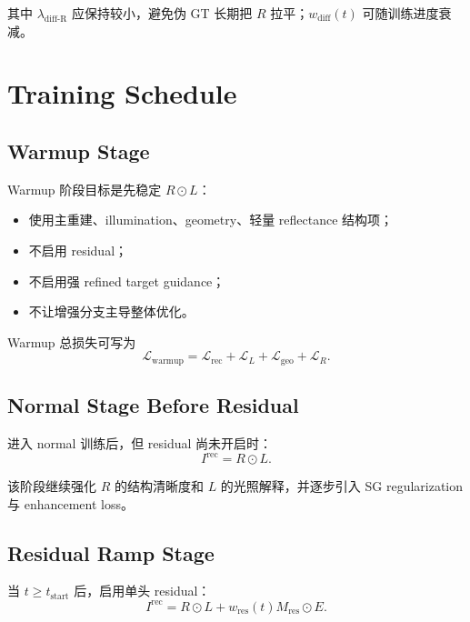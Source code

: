 \documentclass[11pt]{article}
\begin{document}
其中 $\lambda_{\text{diff-R}}$ 应保持较小，避免伪 GT 长期把 $R$ 拉平；$w_{\text{diff}}(t)$ 可随训练进度衰减。

\section{Training Schedule}

\subsection{Warmup Stage}

Warmup 阶段目标是先稳定 $R \odot L$：
\begin{itemize}[leftmargin=1.5em]
    \item 使用主重建、illumination、geometry、轻量 reflectance 结构项；
    \item 不启用 residual；
    \item 不启用强 refined target guidance；
    \item 不让增强分支主导整体优化。
\end{itemize}

Warmup 总损失可写为
\begin{equation}
    \mathcal{L}_{\text{warmup}}
    =
    \mathcal{L}_{\text{rec}}
    +
    \mathcal{L}_{L}
    +
    \mathcal{L}_{\text{geo}}
    +
    \mathcal{L}_{R}.
\end{equation}

\subsection{Normal Stage Before Residual}

进入 normal 训练后，但 residual 尚未开启时：
\begin{equation}
    I^{\text{rec}} = R \odot L.
\end{equation}

该阶段继续强化 $R$ 的结构清晰度和 $L$ 的光照解释，并逐步引入 SG regularization 与 enhancement loss。

\subsection{Residual Ramp Stage}

当 $t \ge t_{\text{start}}$ 后，启用单头 residual：
\begin{equation}
    I^{\text{rec}} = R \odot L + w_{\text{res}}(t)M_{\text{res}}\odot E.
\end{equation}
\end{document}

